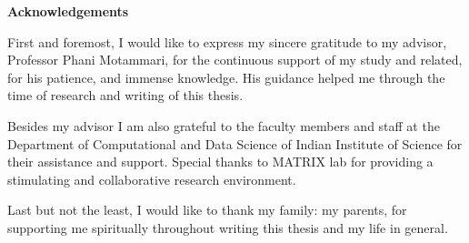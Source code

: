 \documentclass[12pt, oneside]{book}
\theoremstyle{definition}
\theoremstyle{definition}
\theoremstyle{remark}
\newcommand{\acknowledgementsname}{Acknowledgements}  %
\newenvironment{Acknowledgements}{%
\clearpage
\null\vfill
\begin{center}%
    \bfseries \acknowledgementsname
\end{center}}%
{\vfill\null}
\begin{document}
\begin{Acknowledgements}
First and foremost, I would like to express my sincere gratitude to my advisor,
Professor Phani Motammari, for the continuous support of my study and related, for
his patience, and immense knowledge.
His guidance helped me through the time of research and writing of this thesis.

Besides my advisor I am also grateful to the faculty members and staff at the
Department of Computational and Data Science of Indian Institute of Science for
their assistance and support. Special thanks to MATRIX lab for providing a stimulating
and collaborative research environment.

Last but not the least, I would like to thank my family: my parents,
for supporting me spiritually throughout writing this thesis and my life in general.
\end{Acknowledgements}

\tableofcontents  %




\end{document}
